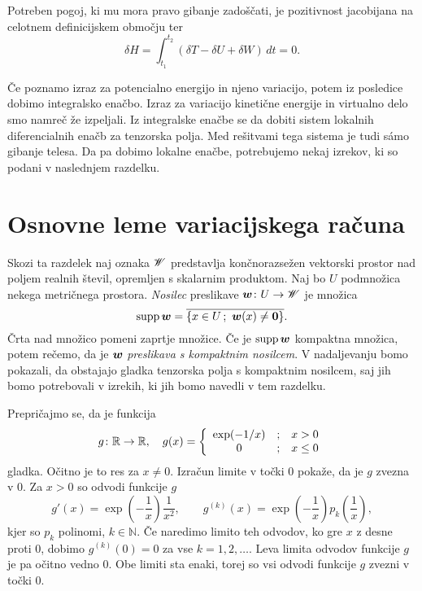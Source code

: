 \begin{posledica} \label{p:varham0}
	Potreben pogoj, ki mu mora pravo gibanje zadoščati, je pozitivnost jacobijana
	na celotnem definicijskem območju ter
	\[ \delta H = \int_{t_1}^{t_2}(\delta T-\delta U+\delta W)\,dt = 0. \]
\end{posledica}

Če poznamo izraz za potencialno energijo in njeno variacijo, potem iz posledice
dobimo integralsko enačbo. Izraz za variacijo kinetične energije in virtualno delo 
smo namreč že izpeljali. Iz integralske enačbe se da dobiti sistem lokalnih diferencialnih enačb
za tenzorska polja. Med rešitvami tega sistema je tudi sámo gibanje telesa.
Da pa dobimo lokalne enačbe, potrebujemo nekaj izrekov, ki so podani v naslednjem razdelku.


\section{Osnovne leme variacijskega računa}


Skozi ta razdelek naj oznaka $\mathscr W$ predstavlja
končnorazsežen vektorski prostor nad poljem realnih števil, opremljen s skalarnim produktom.
Naj bo $U$ podmnožica nekega metričnega prostora.
\emph{Nosilec} preslikave $\boldsymbol w\colon U\to\mathscr W$ je množica
\[ \mathrm{supp}\,\vek{w}=\overline{\{ x\in U\,;\ \vek{w}(x)\neq\vek{0} \}}. \]
Črta nad množico pomeni zaprtje množice. Če je $\mathrm{supp}\,\boldsymbol w$ kompaktna množi\-ca, potem rečemo,
da je $\boldsymbol w$ \emph{preslikava s kompaktnim nosilcem}. V nadaljevanju bomo pokazali, da obstajajo gladka
tenzorska polja s kompaktnim nosilcem, saj jih bomo potrebovali v izrekih, ki jih bomo navedli v tem razdelku.

Prepričajmo se, da je funkcija
\[
	g\colon\mathbb R\to\mathbb R,\quad g(x)=\left\{\begin{array}{ccl}
	\exp(-1/x)&;&x>0 \\ 0&;&x\leq 0 \end{array}\right.
\]
gladka. Očitno je to res za $x\neq 0$. Izračun limite v točki $0$ pokaže, da
je $g$ zvezna v 0. Za $x>0$ so odvodi funkcije $g$
\[
	g'(x)=\exp\left(-\frac{1}{x}\right)\frac{1}{x^2},\qquad
	g^{(k)}(x)=\exp\left(-\frac{1}{x}\right)p_k\left(\frac{1}{x}\right),
\]
kjer so $p_k$ polinomi, $k\in\mathbb{N}$. Če naredimo limito teh odvodov, ko
gre $x$ z desne proti 0, dobimo $g^{(k)}(0)=0$ za vse $k=1,2,\dots$. Leva limita
odvodov funkcije $g$ je pa očitno vedno 0. Obe limiti sta enaki, torej so vsi odvodi
funkcije $g$ zvezni v točki 0.

